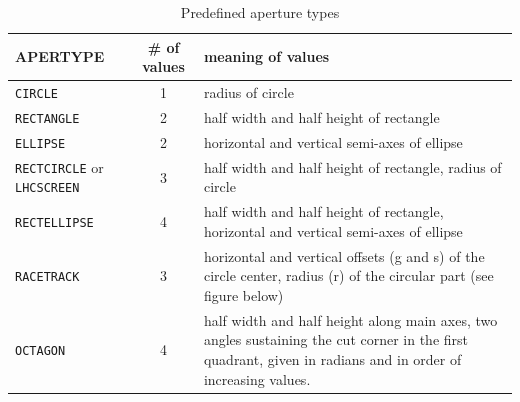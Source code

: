 \begin{5.02.04}
\begin{table}[ht]
	\caption{Predefined aperture types}
	\vspace{1ex}
	\begin{tabular}{|l | c | p{8cm}|}
		\hline 
		{\bf APERTYPE} & {\bf \# of values} & {\bf meaning of values}\\
		\hline
		{\tt CIRCLE} & 1 &  radius of circle \\ 
		\hline
		{\tt RECTANGLE} & 2 & half width and half height of rectangle\\ 
		\hline
		{\tt ELLIPSE} & 2 & horizontal and vertical semi-axes of ellipse \\  
		\hline
		{\tt RECTCIRCLE} or {\tt LHCSCREEN} & 3 & half width and half height of 
		rectangle, radius of circle\\  
		\hline
		{\tt RECTELLIPSE} & 4 & half width and half height of rectangle, 
		horizontal and vertical semi-axes of ellipse \\
		\hline
		{\tt RACETRACK} & 3 & horizontal and vertical offsets (g and s) of the 
		circle center, radius (r) of the circular part (see figure below)\\
		\hline
		{\tt OCTAGON} & 4 & half width and half height along main axes, 
		two angles sustaining the cut corner in the first quadrant, 
		given in radians and in order of increasing values. \\   
		\hline
	\end{tabular}
\end{table}
\end{5.02.04}


